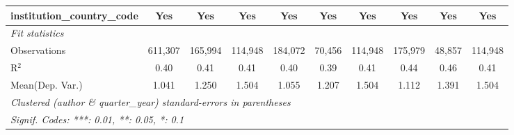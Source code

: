 \begin{tabular}{lccccccccc}
   institution\_country\_code             & Yes           & Yes           & Yes           & Yes           & Yes           & Yes           & Yes           & Yes           & Yes\\  
   \midrule
   \emph{Fit statistics}\\
   Observations                           & 611,307       & 165,994       & 114,948       & 184,072       & 70,456        & 114,948       & 175,979       & 48,857        & 114,948\\  
   R$^2$                                  & 0.40          & 0.41          & 0.41          & 0.40          & 0.39          & 0.41          & 0.44          & 0.46          & 0.41\\  
Mean(Dep. Var.) & 1.041 & 1.250 & 1.504 & 1.055 & 1.207 & 1.504 & 1.112 & 1.391 & 1.504 \\
   \midrule \midrule
   \multicolumn{10}{l}{\emph{Clustered (author \& quarter\_year) standard-errors in parentheses}}\\
   \multicolumn{10}{l}{\emph{Signif. Codes: ***: 0.01, **: 0.05, *: 0.1}}\\
\end{tabular}
\par\endgroup
